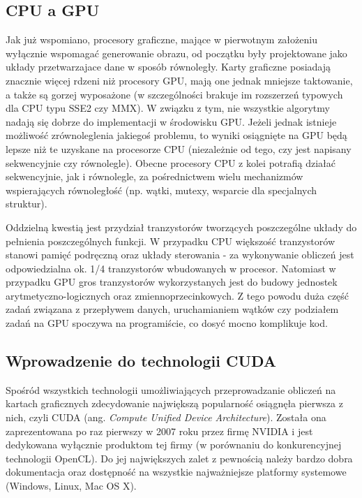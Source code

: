 \documentclass[12pt]{article}
\begin{document}
\subsection{CPU a GPU}

Jak już wspomiano, procesory graficzne, mające w pierwotnym założeniu wyłącznie wspomagać generowanie obrazu, od początku były projektowane jako układy przetwarzajace dane w sposób równoległy. Karty graficzne posiadają znacznie więcej rdzeni niż procesory GPU, mają one jednak mniejsze taktowanie, a także są gorzej wyposażone (w szczególności brakuje im rozszerzeń typowych dla CPU typu SSE2 czy MMX). W związku z tym, nie wszystkie algorytmy nadają się dobrze do implementacji w środowisku GPU. Jeżeli jednak istnieje możliwość zrównoleglenia jakiegoś problemu, to wyniki osiągnięte na GPU będą lepsze niż te uzyskane na procesorze CPU (niezależnie od tego, czy jest napisany sekwencyjnie czy równolegle). Obecne procesory CPU z kolei potrafią działać sekwencyjnie, jak i równolegle, za pośrednictwem wielu mechanizmów wspierających równoległość (np. wątki, mutexy, wsparcie dla specjalnych struktur).

Oddzielną kwestią jest przydział tranzystorów tworzących poszczególne układy do pełnienia poszczególnych funkcji. W przypadku CPU większość tranzystorów stanowi pamięć podręczną oraz układy sterowania - za wykonywanie obliczeń jest odpowiedzialna ok. 1/4 tranzystorów wbudowanych w procesor. Natomiast w przypadku GPU gros tranzystorów wykorzystanych jest do budowy jednostek arytmetyczno-logicznych oraz zmiennoprzecinkowych. Z tego powodu duża część zadań związana z przepływem danych, uruchamianiem wątków czy podziałem zadań na GPU spoczywa na programiście, co dosyć mocno komplikuje kod.

\subsection{Wprowadzenie do technologii CUDA}

Spośród wszystkich technologii umożliwiających przeprowadzanie obliczeń na kartach graficznych zdecydowanie największą popularność osiągnęła pierwsza z nich, czyli CUDA (ang. \textit{Compute Unified Device Architecture}). Została ona zaprezentowana po raz pierwszy w 2007 roku przez firmę NVIDIA i jest dedykowana wyłącznie produktom tej firmy (w porównaniu do konkurencyjnej technologii OpenCL). Do jej największych zalet z pewnością należy bardzo dobra dokumentacja oraz dostępność na wszystkie najważniejsze platformy systemowe (Windows, Linux, Mac OS X).
\end{document}
